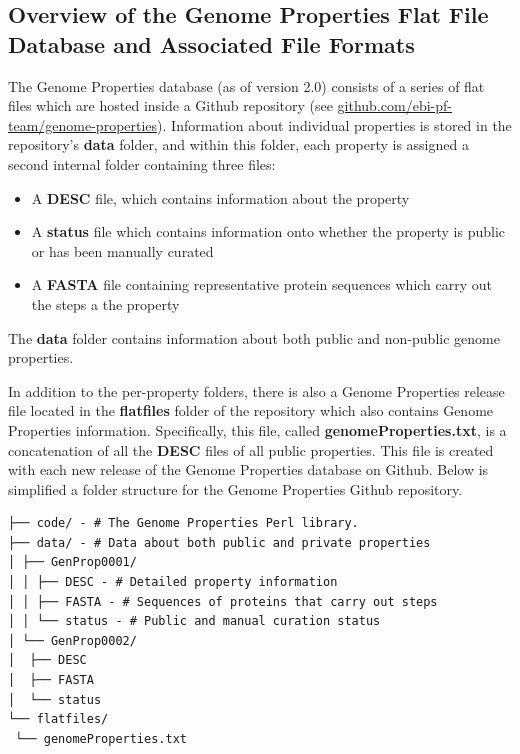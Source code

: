 \subsection{Overview of the Genome Properties Flat File Database and Associated File Formats}

The Genome Properties database (as of version 2.0) consists of a series of flat files which are hosted inside a Github repository (see \href{github.com/ebi-pf-team/genome-properties}{github.com/ebi-pf-team/genome-properties}). Information about individual properties is stored in the repository's \textbf{data} folder, and within this folder, each property is assigned a second internal folder containing three files: 
\begin{itemize}
\item A \textbf{DESC} file, which contains information about the property
\item A \textbf{status} file which contains information onto whether the property is public or has been manually curated
\item A \textbf{FASTA} \cite{pearson19905} file containing representative protein sequences which carry out the steps a the property
\end{itemize}
The \textbf{data} folder contains information about both public and non-public genome properties. 

In addition to the per-property folders, there is also a Genome Properties release file located in the \textbf{flatfiles} folder of the repository which also contains Genome Properties information. Specifically, this file, called \textbf{genomeProperties.txt}, is a concatenation of all the \textbf{DESC} files of all public properties. This file is created with each new release of the Genome Properties database on Github. Below is simplified a folder structure for the Genome Properties Github repository.

\begin{verbatim}
├── code/ - # The Genome Properties Perl library.
├── data/ - # Data about both public and private properties
│ ├── GenProp0001/
│ │ ├── DESC - # Detailed property information
│ │ ├── FASTA - # Sequences of proteins that carry out steps
│ │ └── status - # Public and manual curation status
│ └── GenProp0002/
│  ├── DESC
│  ├── FASTA
│  └── status
└── flatfiles/
 └── genomeProperties.txt
\end{verbatim}

